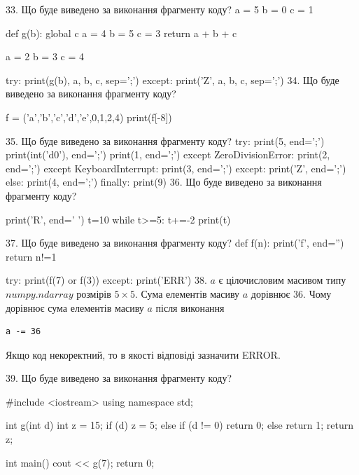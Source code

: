 \documentclass[11pt]{article}
\begin{document}
\vspace{5mm}
33. Що буде виведено за виконання фрагменту коду?
a = 5
b = 0
c = 1

def g(b):
global c    a = 4
    b = 5
    c = 3
    return a + b + c

a = 2
b = 3
c = 4

try:
    print(g(b), a, b, c, sep=';')
except:
    print('Z', a, b, c, sep=';')
\vspace{5mm}
34. Що буде виведено за виконання фрагменту коду?

f = ('a','b','c','d','e',0,1,2,4)
print(f[-8])

\vspace{5mm}
35. Що буде виведено за виконання фрагменту коду?
try:
    print(5, end=';')
    print(int('d0'), end=';')
    print(1, end=';')
except ZeroDivisionError:
    print(2, end=';')
except KeyboardInterrupt:
    print(3, end=';')
except:
    print('Z', end=';')
else:
    print(4, end=';')
finally:
    print(9)
\vspace{5mm}
36. Що буде виведено за виконання фрагменту коду?

print('R', end=' ')
t=10
while t>=5:
    t+=-2
print(t)

\vspace{5mm}
37. Що буде виведено за виконання фрагменту коду?
def f(n):
    print('f', end='')
    return n!=1

try:
    print(f(7) or f(3))
except:
    print('ERR')
\vspace{5mm}
38. 
$a$ є цілочисловим масивом типу $numpy.ndarray$ розмірів $5{\times}5$. Сума елементів масиву $a$ дорівнює 36. Чому дорівнює сума елементів масиву $a$ після виконання 
\begin{verbatim}
a -= 36
\end{verbatim}


Якщо код некоректний, то в якості відповіді зазначити ERROR.


\vspace{5mm}
39. Що буде виведено за виконання фрагменту коду?

#include <iostream>
using namespace std;

int g(int d){
    int z = 15;
    if (d) 
        z = 5;
    else if (d != 0)
         return 0;
    else
         return 1;
    return z;
}

int main(){
    cout << g(7);
    return 0;
}
\end{document}
